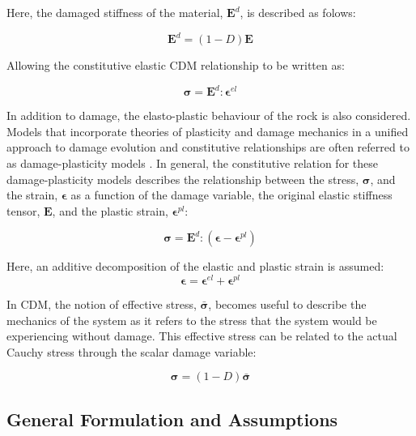 Here, the damaged stiffness of the material, $\mathbf{E}^d$, is described as folows:

\begin{equation}
\mathbf{E}^d=\left(1-D\right)\mathbf{E}
\label{eqn:const3}
\end{equation}

Allowing the constitutive elastic CDM relationship to be written as:

\begin{equation}
\boldsymbol{\sigma}=\mathbf{E}^d:\boldsymbol{\epsilon}^{el}
\label{eqn:const4}
\end{equation}

In addition to damage, the elasto-plastic behaviour of the rock is also considered. Models that incorporate theories of plasticity and damage mechanics in a unified approach to damage evolution and constitutive relationships are often referred to as damage-plasticity models \citep{zhang_continuum_2010}. In general, the constitutive relation for these damage-plasticity models describes the relationship between the stress, $\boldsymbol{\sigma}$, and the strain, $\boldsymbol{\epsilon}$ as a function of the damage variable, the original elastic stiffness tensor, $\mathbf{E}$, and the plastic strain, $\boldsymbol{\epsilon}^{pl}$: 

\begin{equation}
\boldsymbol{\sigma}=\mathbf{E}^d:\left(\boldsymbol{\epsilon}-\boldsymbol{\epsilon}^{pl}\right)
\label{eqn:const5}
\end{equation}

Here, an additive decomposition of the elastic and plastic strain is assumed:
\begin{equation}
\boldsymbol{\epsilon}=\boldsymbol{\epsilon}^{el}+\boldsymbol{\epsilon}^{pl}
\label{eqn:const6}
\end{equation}

In CDM, the notion of effective stress, $\bar{\boldsymbol{\sigma}}$, becomes useful to describe the mechanics of the system as it refers to the stress that the system would be experiencing without damage. This effective stress can be related to the actual Cauchy stress through the scalar damage variable: 

\begin{equation}
\boldsymbol{\sigma}=\left(1-D\right)\bar{\boldsymbol{\sigma}}
\label{eqn:const7}
\end{equation}

\subsection{General Formulation and Assumptions}

